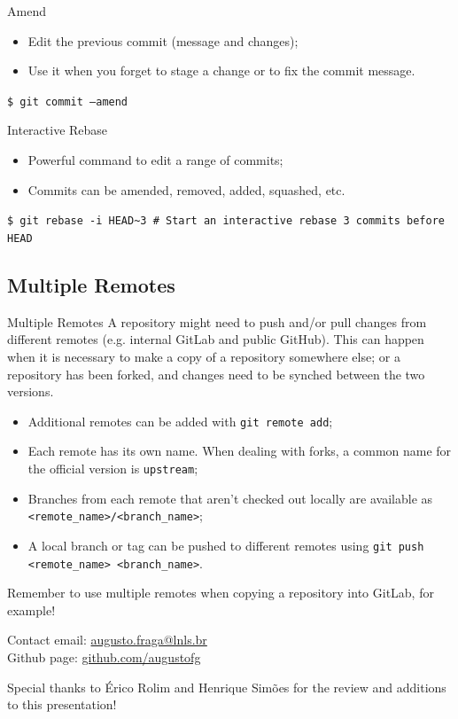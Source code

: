 \documentclass{beamer}
\begin{document}
\begin{frame}{Amend}
  \begin{itemize}
    \item Edit the previous commit (message and changes);
    \item Use it when you forget to stage a change or to fix the commit message.
  \end{itemize}
  \begin{block}{}
    \texttt{\$ git commit --amend}
  \end{block}
\end{frame}

\begin{frame}{Interactive Rebase}
  \begin{itemize}
    \item Powerful command to edit a range of commits;
    \item Commits can be amended, removed, added, squashed, etc.
  \end{itemize}
  \begin{block}{}
    \texttt{\$ git rebase -i HEAD\textasciitilde{}3 \# Start an interactive rebase 3 commits before HEAD}
  \end{block}
\end{frame}

\subsection{Multiple Remotes}
\begin{frame}{Multiple Remotes}
  A repository might need to push and/or pull changes from different remotes (e.g. internal GitLab and public GitHub). This can happen when it is necessary to make a copy of a repository somewhere else; or a repository has been forked, and changes need to be synched between the two versions.
  \begin{itemize}
    \item Additional remotes can be added with \texttt{git remote add};
    \item Each remote has its own name. When dealing with forks, a common name for the official version is \texttt{upstream};
    \item Branches from each remote that aren't checked out locally are available as \texttt{<remote\_name>/<branch\_name>};
    \item A local branch or tag can be pushed to different remotes using \texttt{git push <remote\_name> <branch\_name>}.
  \end{itemize}
  \begin{block}{}
    Remember to use multiple remotes when copying a repository into GitLab, for example!
  \end{block}
\end{frame}

\begin{frame}{Contact}
  email: \href{mailto:augusto.fraga@lnls.br}{augusto.fraga@lnls.br} \\
  Github page: \url{github.com/augustofg} \\
  \begin{center}
    Special thanks to Érico Rolim and Henrique Simões for the review and additions to this presentation!
  \end{center}
\end{frame}
\end{document}
